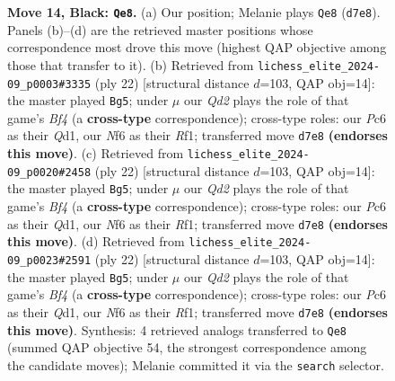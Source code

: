 \documentclass[11pt]{article}
\begin{document}
\begin{figure}[p]
\caption{\textbf{Move 14, Black: \texttt{Qe8}.} (a) Our position; Melanie plays \texttt{Qe8} (\texttt{d7e8}). Panels (b)--(d) are the retrieved master positions whose correspondence most drove this move (highest QAP objective among those that transfer to it). (b) Retrieved from \texttt{lichess\_elite\_2024-09\_p0003\#3335} (ply 22) [structural distance $d$=103, QAP obj=14]: the master played \texttt{Bg5}; under $\mu$ our \emph{Qd2} plays the role of that game's \emph{Bf4} (a \textbf{cross-type} correspondence); cross-type roles: our \emph{P}c6 as their \emph{Q}d1, our \emph{N}f6 as their \emph{R}f1; transferred move \texttt{d7e8} \textbf{(endorses this move)}. (c) Retrieved from \texttt{lichess\_elite\_2024-09\_p0020\#2458} (ply 22) [structural distance $d$=103, QAP obj=14]: the master played \texttt{Bg5}; under $\mu$ our \emph{Qd2} plays the role of that game's \emph{Bf4} (a \textbf{cross-type} correspondence); cross-type roles: our \emph{P}c6 as their \emph{Q}d1, our \emph{N}f6 as their \emph{R}f1; transferred move \texttt{d7e8} \textbf{(endorses this move)}. (d) Retrieved from \texttt{lichess\_elite\_2024-09\_p0023\#2591} (ply 22) [structural distance $d$=103, QAP obj=14]: the master played \texttt{Bg5}; under $\mu$ our \emph{Qd2} plays the role of that game's \emph{Bf4} (a \textbf{cross-type} correspondence); cross-type roles: our \emph{P}c6 as their \emph{Q}d1, our \emph{N}f6 as their \emph{R}f1; transferred move \texttt{d7e8} \textbf{(endorses this move)}. Synthesis: 4 retrieved analogs transferred to \texttt{Qe8} (summed QAP objective 54, the strongest correspondence among the candidate moves); Melanie committed it via the \texttt{search} selector.}
\label{fig:thought-m27}
\end{figure}

\clearpage
\end{document}
